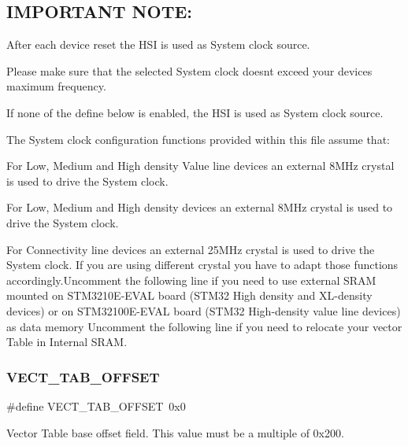 \subsection*{I\+M\+P\+O\+R\+T\+A\+NT N\+O\+TE\+: }


\begin{DoxyEnumerate}
\item After each device reset the H\+SI is used as System clock source.
\item Please make sure that the selected System clock doesn\textquotesingle{}t exceed your device\textquotesingle{}s maximum frequency.
\item If none of the define below is enabled, the H\+SI is used as System clock source.
\item The System clock configuration functions provided within this file assume that\+:
\begin{DoxyItemize}
\item For Low, Medium and High density Value line devices an external 8\+M\+Hz crystal is used to drive the System clock.
\item For Low, Medium and High density devices an external 8\+M\+Hz crystal is used to drive the System clock.
\item For Connectivity line devices an external 25\+M\+Hz crystal is used to drive the System clock. If you are using different crystal you have to adapt those functions accordingly.\+Uncomment the following line if you need to use external S\+R\+AM mounted on S\+T\+M3210\+E-\/\+E\+V\+AL board (S\+T\+M32 High density and X\+L-\/density devices) or on S\+T\+M32100\+E-\/\+E\+V\+AL board (S\+T\+M32 High-\/density value line devices) as data memory Uncomment the following line if you need to relocate your vector Table in Internal S\+R\+AM. 
\end{DoxyItemize}
\end{DoxyEnumerate}\mbox{\label{group___s_t_m32_f10x___system___private___defines_ga40e1495541cbb4acbe3f1819bd87a9fe}} 
\subsubsection{V\+E\+C\+T\+\_\+\+T\+A\+B\+\_\+\+O\+F\+F\+S\+ET}
{\footnotesize\ttfamily \#define V\+E\+C\+T\+\_\+\+T\+A\+B\+\_\+\+O\+F\+F\+S\+ET~0x0}

Vector Table base offset field. This value must be a multiple of 0x200. 